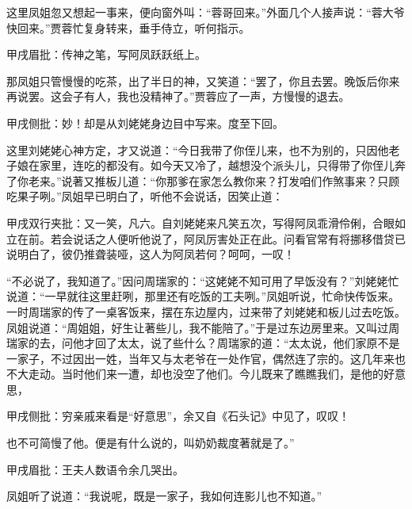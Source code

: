 \begin{parag}

    这里凤姐忽又想起一事来，便向窗外叫：“蓉哥回来。”外面几个人接声说：“蓉大爷快回来。”贾蓉忙复身转来，垂手侍立，听何指示。\begin{note}甲戌眉批：传神之笔，写阿凤跃跃纸上。\end{note}那凤姐只管慢慢的吃茶，出了半日的神，又笑道：“罢了，你且去罢。晚饭后你来再说罢。这会子有人，我也没精神了。”贾蓉应了一声，方慢慢的退去。\begin{note}甲戌侧批：妙！却是从刘姥姥身边目中写来。度至下回。\end{note}
\end{parag}


\begin{parag}

    这里刘姥姥心神方定，才又说道：“今日我带了你侄儿来，也不为别的，只因他老子娘在家里，连吃的都没有。如今天又冷了，越想没个派头儿，只得带了你侄儿奔了你老来。”说著又推板儿道：“你那爹在家怎么教你来？打发咱们作煞事来？只顾吃果子咧。”凤姐早已明白了，听他不会说话，因笑止道：\begin{note}甲戌双行夹批：又一笑，凡六。自刘姥姥来凡笑五次，写得阿凤乖滑伶俐，合眼如立在前。若会说话之人便听他说了，阿凤厉害处正在此。问看官常有将挪移借贷已说明白了，彼仍推聋装哑，这人为阿凤若何？呵呵，一叹！\end{note}“不必说了，我知道了。”因问周瑞家的：“这姥姥不知可用了早饭没有？”刘姥姥忙说道：“一早就往这里赶咧，那里还有吃饭的工夫咧。”凤姐听说，忙命快传饭来。一时周瑞家的传了一桌客饭来，摆在东边屋内，过来带了刘姥姥和板儿过去吃饭。凤姐说道：“周姐姐，好生让著些儿，我不能陪了。”于是过东边房里来。又叫过周瑞家的去，问他才回了太太，说了些什么？周瑞家的道：“太太说，他们家原不是一家子，不过因出一姓，当年又与太老爷在一处作官，偶然连了宗的。这几年来也不大走动。当时他们来一遭，却也没空了他们。今儿既来了瞧瞧我们，是他的好意思，\begin{note}甲戌侧批：穷亲戚来看是“好意思”，余又自《石头记》中见了，叹叹！\end{note}也不可简慢了他。便是有什么说的，叫奶奶裁度著就是了。”\begin{note}甲戌眉批：王夫人数语令余几哭出。\end{note}凤姐听了说道：“我说呢，既是一家子，我如何连影儿也不知道。”
\end{parag}


